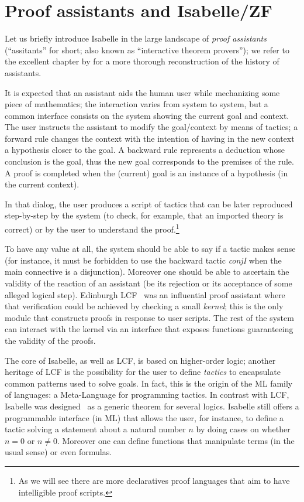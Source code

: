 \section{Proof assistants and Isabelle/ZF}
\label{sec:proof-assist-isabelle}

Let us briefly introduce Isabelle in the large landscape of \emph{proof
assistants} (“assitants” for short; also known as “interactive theorem provers”); we refer to the
excellent chapter by \citet{DBLP:series/hhl/HarrisonUW14} for a more
thorough reconstruction of the history of assistants.

It is expected that an assistant aids the human user while mechanizing
some piece of mathematics; the interaction varies from system to
system, but a common interface consists on the system showing the
current goal and context. The user instructs the assistant to modify the
goal/context by means of tactics; a forward rule changes the context
with the intention of having in the new context a hypothesis closer to
the goal. A backward rule represents a deduction whose conclusion is
the goal, thus the new goal corresponds to the premises of the rule. A
proof is completed when the (current) goal is an instance of a
hypothesis (in the current context).

In that dialog, the user produces a script of tactics that can be
later reproduced step-by-step by the system (to check, for example,
that an imported theory is correct) or by the user to understand
the proof.\footnote{As we will see there are more declaratives
proof languages that aim to have intelligible proof scripts.}

To have any value at all, the system should be able to say if a tactic
makes sense (for instance, it must be forbidden to use the backward
tactic \textit{conjI} when the main connective is a
disjunction). Moreover one should be able to ascertain the validity of
the reaction of an assistant (be its rejection or its acceptance of some
alleged logical step). Edinburgh LCF~\cite{Gordon1979-qm} was an
influential proof assistant where that verification could be achieved
by checking a small \emph{kernel}; this is the only module that
constructs proofs in response to user scripts. The rest of the system
can interact with the kernel via an interface that exposes functions
guaranteeing the validity of the proofs.

The core of Isabelle, as well as LCF, is based on higher-order logic;
another heritage of LCF is the possibility for the user to define
\emph{tactics} to encapsulate common patterns used to solve goals. In
fact, this is the origin of the ML family of languages: a
Meta-Language for programming tactics. In contrast with LCF, Isabelle
was designed~\cite{Paulson1990} as a generic theorem for several
logics. Isabelle still offers a programmable interface (in ML) that
allows the user, for instance, to define a tactic solving a statement
about a natural number $n$ by doing cases on whether $n=0$ or
$n\neq 0$.  Moreover one can define functions that manipulate terms
(in the usual sense) or even formulas.

